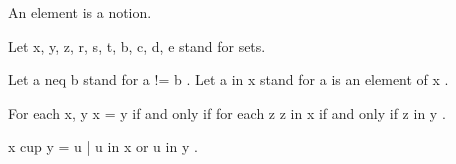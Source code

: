 \documentclass[a4paper,draft]{amsproc}
\begin{document}
\begin{forthel}
\begin{signature}[ElmSort]
An element is a notion.
\end{signature}




Let  x, y, z, r, s, t, b, c, d, e  stand for sets.

Let  a neq b  stand for  a  !=  b .
Let  a in x  stand for  a  is an element of  x .


\begin{axiom}
For each  x, y   x = y  if and only if for each  z   z in x  if and only if  z in y .
\end{axiom}





\begin{definition} 
 x cup y = {  u | u in x  or  u in y } .
\end{definition}


\end{forthel}
\end{document}
